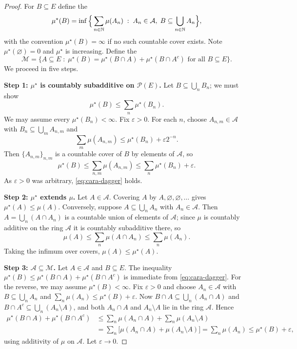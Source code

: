 \documentclass[a4paper]{scrartcl}
\newcommand{\cA}{\mathcal{A}}
\newcommand{\cM}{\mathcal{M}}
\begin{document}
\begin{proof}
	For $B \subseteq E$ define the 
	$$
	\mu^\star(B) = \inf \Big\{ \sum_{n \in \N} \mu(A_n) \; : \; A_n \in \cA, \; B \subseteq \bigcup_{n \in \N} A_n \Big\},
	$$
	with the convention $\mu^\star(B) = \infty$ if no such countable cover exists. Note $\mu^\star(\varnothing) = 0$ and $\mu^\star$ is increasing. Define the 
	$$
	\cM = \big\{ A \subseteq E \; : \; \mu^\star(B) = \mu^\star(B \cap A) + \mu^\star(B \cap A^c) \text{ for all } B \subseteq E \big\}.
	$$
	We proceed in five steps.

	\textbf{Step 1: $\mu^\star$ is countably subadditive on $\mathcal{P}(E)$.} Let $B \subseteq \bigcup_n B_n$; we must show
	\begin{equation}\label{eq:cara-dagger}
		\mu^\star(B) \leq \sum_n \mu^\star(B_n). \tag{$\dagger$}
	\end{equation}
	We may assume every $\mu^\star(B_n) < \infty$. Fix $\varepsilon > 0$. For each $n$, choose $A_{n,m} \in \cA$ with $B_n \subseteq \bigcup_m A_{n,m}$ and
	$$
	\sum_m \mu(A_{n,m}) \leq \mu^\star(B_n) + \varepsilon 2^{-n}.
	$$
	Then $\{A_{n,m}\}_{n,m}$ is a countable cover of $B$ by elements of $\cA$, so
	$$
	\mu^\star(B) \leq \sum_{n,m} \mu(A_{n,m}) \leq \sum_n \mu^\star(B_n) + \varepsilon.
	$$
	As $\varepsilon>0$ was arbitrary, \eqref{eq:cara-dagger} holds.

	\textbf{Step 2: $\mu^\star$ extends $\mu$.} Let $A \in \cA$. Covering $A$ by $A, \varnothing, \varnothing, \dots$ gives $\mu^\star(A) \leq \mu(A)$. Conversely, suppose $A \subseteq \bigcup_n A_n$ with $A_n \in \cA$. Then $A = \bigcup_n (A \cap A_n)$ is a countable union of elements of $\cA$; since $\mu$ is countably additive on the ring $\cA$ it is countably subadditive there, so
	$$
	\mu(A) \leq \sum_n \mu(A \cap A_n) \leq \sum_n \mu(A_n).
	$$
	Taking the infimum over covers, $\mu(A) \leq \mu^\star(A)$.

	\textbf{Step 3: $\cA \subseteq \cM$.} Let $A \in \cA$ and $B \subseteq E$. The inequality $\mu^\star(B) \leq \mu^\star(B \cap A) + \mu^\star(B\cap A^c)$ is immediate from \eqref{eq:cara-dagger}. For the reverse, we may assume $\mu^\star(B) < \infty$. Fix $\varepsilon > 0$ and choose $A_n \in \cA$ with $B \subseteq \bigcup_n A_n$ and $\sum_n \mu(A_n) \leq \mu^\star(B) + \varepsilon$. Now $B \cap A \subseteq \bigcup_n (A_n \cap A)$ and $B \cap A^c \subseteq \bigcup_n (A_n \setminus A)$, and both $A_n \cap A$ and $A_n \setminus A$ lie in the ring $\cA$. Hence
	\begin{align*}
		\mu^\star(B\cap A) + \mu^\star(B \cap A^c) &\leq \sum_n \mu(A_n \cap A) + \sum_n \mu(A_n \setminus A) \\
		&= \sum_n \big[ \mu(A_n \cap A) + \mu(A_n \setminus A) \big] = \sum_n \mu(A_n) \leq \mu^\star(B) + \varepsilon,
	\end{align*}
	using additivity of $\mu$ on $\cA$. Let $\varepsilon \to 0$.


\end{proof}
\end{document}

